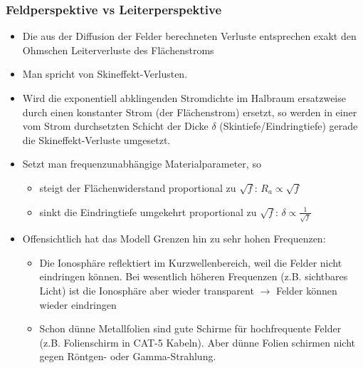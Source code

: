 \begin{frame}
   \frametitle{Feldperspektive vs Leiterperspektive}
\begin{itemize}[<+->]
\item Die aus der Diffusion der Felder berechneten Verluste entsprechen exakt den Ohmschen Leiterverluste des Flächenstroms
\item Man spricht von \alert{Skineffekt-Verlusten}.
  \item Wird die exponentiell abklingenden Stromdichte im Halbraum
 \alert{ersatzweise} durch einen konstanter Strom (der \alert{Flächenstrom}) ersetzt, so werden in einer
 vom Strom durchsetzten Schicht der Dicke $\delta$ \alert{(Skintiefe/Eindringtiefe)}
 gerade die Skineffekt-Verluste umgesetzt.
\item Setzt man \alert{frequenzunabhängige Materialparameter}, so
  \begin{itemize}[<+->]
  \item steigt der Flächenwiderstand proportional zu $\sqrt{f}$: $R_a \propto \sqrt{f}$
  \item sinkt die Eindringtiefe umgekehrt proportional zu $\sqrt{f}$: $\delta \propto \frac{1}{\sqrt{f}}$
  \end{itemize}
\item Offensichtlich hat das Modell \alert{Grenzen hin zu sehr hohen Frequenzen}:
    \begin{itemize}[<+->]
    \item Die Ionosphäre reflektiert im Kurzwellenbereich, weil die Felder nicht eindringen können. Bei wesentlich höheren Frequenzen (z.B. sichtbares Licht) ist die Ionosphäre aber wieder transparent $\to$ Felder können wieder eindringen
      \item Schon dünne Metallfolien sind gute Schirme für hochfrequente Felder (z.B. Folienschirm in CAT-5 Kabeln). Aber dünne Folien schirmen nicht gegen Röntgen- oder Gamma-Strahlung.
\end{itemize}
\end{itemize}
\end{frame}


   
